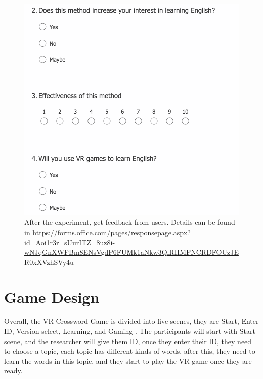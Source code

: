 \documentclass{vgtc}                          %
\begin{document}
\begin{figure}[H]
 \centering 
 \includegraphics[width=\columnwidth]{pictures/PostPref.png}
 \caption{After the experiment, get feedback from users. Details can be found in \url{https://forms.office.com/pages/responsepage.aspx?id=Aoi1r3r_sUurITZ_8uz8i-wNJqGnXWFBm8ENsVgdP6FUMk1aNkw3QlRHMFNCRDFOUzJER0xXVzhSVy4u} }
   \label{fig:postpref}
\end{figure}
\section{Game Design}
Overall, the VR Crossword Game is divided into five scenes, they are Start, Enter ID, Version select, Learning, and Gaming \cite{lin2007implementation}. The participants will start with Start scene, and the researcher will give them ID, once they enter their ID, they need to choose a topic, each topic has different kinds of words, after this, they need to learn the words in this topic, and they start to play the VR game once they are ready.
\end{document}

